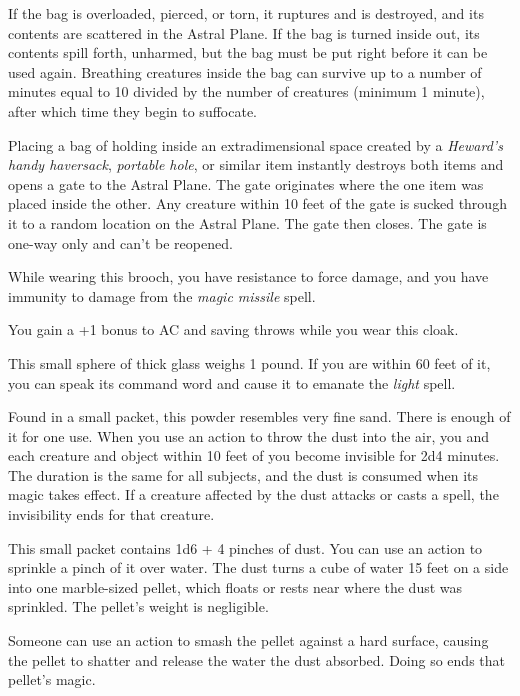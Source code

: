 \documentclass[10pt,a4paper,twoside,fancy,bg=print,twocolumn,openany,nodeprecatedcode]{dndbook}
\begin{document}
If the bag is overloaded, pierced, or torn, it ruptures and is destroyed, and its contents are scattered in the Astral Plane. If the bag is turned inside out, its contents spill forth, unharmed, but the bag must be put right before it can be used again. Breathing creatures inside the bag can survive up to a number of minutes equal to 10 divided by the number of creatures (minimum 1 minute), after which time they begin to suffocate.

Placing a bag of holding inside an extradimensional space created by a \textit{Heward's handy haversack}, \textit{portable hole}, or similar item instantly destroys both items and opens a gate to the Astral Plane. The gate originates where the one item was placed inside the other. Any creature within 10 feet of the gate is sucked through it to a random location on the Astral Plane. The gate then closes. The gate is one-way only and can't be reopened.

While wearing this brooch, you have resistance to force damage, and you have immunity to damage from the \textit{magic missile} spell.

You gain a +1 bonus to AC and saving throws while you wear this cloak.

This small sphere of thick glass weighs 1 pound. If you are within 60 feet of it, you can speak its command word and cause it to emanate the \textit{light} spell.

Found in a small packet, this powder resembles very fine sand. There is enough of it for one use. When you use an action to throw the dust into the air, you and each creature and object within 10 feet of you become invisible for 2d4 minutes. The duration is the same for all subjects, and the dust is consumed when its magic takes effect. If a creature affected by the dust attacks or casts a spell, the invisibility ends for that creature.

This small packet contains 1d6 + 4 pinches of dust. You can use an action to sprinkle a pinch of it over water. The dust turns a cube of water 15 feet on a side into one marble-sized pellet, which floats or rests near where the dust was sprinkled. The pellet's weight is negligible.

Someone can use an action to smash the pellet against a hard surface, causing the pellet to shatter and release the water the dust absorbed. Doing so ends that pellet's magic.
\end{document}
